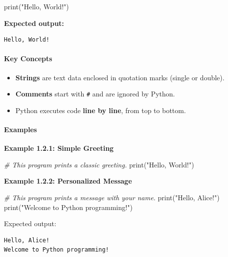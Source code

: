\documentclass[
  justified,
  openright,
]{tufte-book}
\let\subsection\paragraph
\let\paragraph\paragraph
\newcommand{\StringTok}[1]{\textcolor{CodeString}{#1}}              %
\newcommand{\CommentTok}[1]{\textcolor{CodeComment}{\textit{#1}}}  %
\newenvironment{Shaded}{%
  \begin{mdframed}[style=TufteCode]%
}{%
  \end{mdframed}%
}
\let\subsection\paragraph
\let\paragraph\paragraph
\providecommand{\tightlist}{%
  \setlength{\itemsep}{0pt}\setlength{\parskip}{0pt}}
\begin{document}
\begin{Shaded}
\begin{Highlighting}[]
print(\StringTok{"Hello, World!"})
\end{Highlighting}
\end{Shaded}

\textbf{Expected output:}

\begin{verbatim}
Hello, World!
\end{verbatim}

\subsection{Key Concepts}\label{key-concepts}

\begin{itemize}
\tightlist
\item
  \textbf{Strings} are text data enclosed in quotation marks (single or
  double).
\item
  \textbf{Comments} start with \texttt{\#} and are ignored by Python.
\item
  Python executes code \textbf{line by line}, from top to bottom.
\end{itemize}

\subsection{Examples}\label{examples}

\textbf{Example 1.2.1: Simple Greeting}

\begin{Shaded}
\begin{Highlighting}[]
\CommentTok{\# This program prints a classic greeting.}
print(\StringTok{"Hello, World!"})
\end{Highlighting}
\end{Shaded}

\textbf{Example 1.2.2: Personalized Message}

\begin{Shaded}
\begin{Highlighting}[]
\CommentTok{\# This program prints a message with your name.}
print(\StringTok{"Hello, Alice!"})
print(\StringTok{"Welcome to Python programming!"})
\end{Highlighting}
\end{Shaded}

Expected output:

\begin{verbatim}
Hello, Alice!
Welcome to Python programming!
\end{verbatim}
\end{document}
